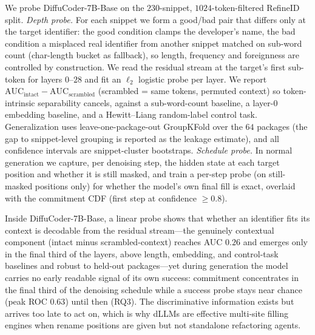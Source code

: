 We probe DiffuCoder-7B-Base on the $230$-snippet, $1024$-token-filtered RefineID
split. \emph{Depth probe.} For each snippet we form a good/bad pair that differs
only at the target identifier: the good condition clamps the developer's name,
the bad condition a misplaced real identifier from another snippet matched on
sub-word count (char-length bucket as fallback), so length, frequency and
foreignness are controlled by construction. We read the residual stream at the
target's first sub-token for layers $0$--$28$ and fit an $\ell_2$ logistic probe
per layer. We report $\mathrm{AUC}_{\text{intact}}-\mathrm{AUC}_{\text{scrambled}}$
(scrambled = same tokens, permuted context) so token-intrinsic separability
cancels, against a sub-word-count baseline, a layer-0 embedding baseline, and a
Hewitt--Liang random-label control task. Generalization uses leave-one-package-out
GroupKFold over the $64$ packages (the gap to snippet-level grouping is reported
as the leakage estimate), and all confidence intervals are snippet-cluster
bootstraps. \emph{Schedule probe.} In normal generation we capture, per denoising
step, the hidden state at each target position and whether it is still masked, and
train a per-step probe (on still-masked positions only) for whether the model's
own final fill is exact, overlaid with the commitment CDF (first step at
confidence $\geq0.8$).


Inside DiffuCoder-7B-Base, a linear probe shows that whether an identifier fits
its context is decodable from the residual stream---the genuinely contextual
component (intact minus scrambled-context) reaches AUC $0.26$ and emerges only in
the final third of the layers, above length, embedding, and control-task
baselines and robust to held-out packages---yet during generation the model
carries no early readable signal of its own success: commitment concentrates in
the final third of the denoising schedule while a success probe stays near chance
(peak ROC $0.63$) until then (RQ3). The discriminative information exists but
arrives too late to act on, which is why dLLMs are effective multi-site filling
engines when rename positions are given but not standalone refactoring agents.


